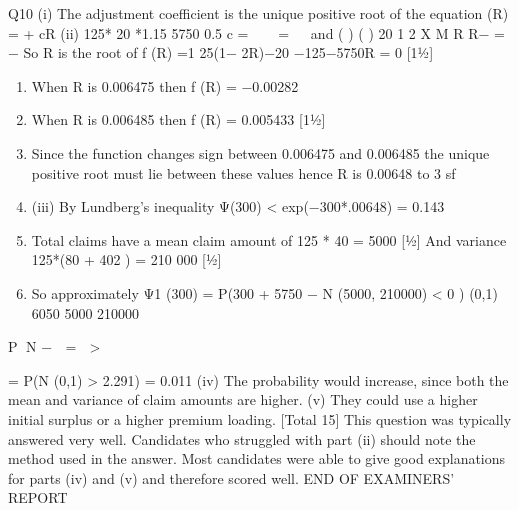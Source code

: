 \documentclass[a4paper,12pt]{article}
\begin{document}

Q10 (i) The adjustment coefficient is the unique positive root of the equation
\lambdaMX (R) = \lambda + cR 
(ii) 125* 20 *1.15 5750
0.5
c =   =
   
and
( ) ( ) 20 1 2 X M R R− = − 
So R is the root of
f (R) =1 25(1− 2R)−20 −125−5750R = 0 [1½]
\begin{enumerate}
\item When R is 0.006475 then f (R) = −0.00282
\item When R is 0.006485 then f (R) = 0.005433 [1½]
\item Since the function changes sign between 0.006475 and 0.006485 the unique
positive root must lie between these values hence R is 0.00648 to 3 sf 
\item (iii) By Lundberg’s inequality Ψ(300) < exp(−300*.00648) = 0.143 
\item Total claims have a mean claim amount of 125 * 40 = 5000 [½]
And variance 125*(80 + 402 ) = 210 000 [½]
\item So approximately
Ψ1 (300) = P(300 + 5750 − N (5000, 210000) < 0 )
(0,1) 6050 5000
210000
\end{enumerate}
P N −  =  > 
 

= P(N (0,1) > 2.291) = 0.011 
(iv) The probability would increase, since both the mean and variance of claim
amounts are higher. 
(v) They could use a higher initial surplus or a higher premium loading. 
[Total 15]
This question was typically answered very well. Candidates who struggled
with part (ii) should note the method used in the answer. Most candidates
were able to give good explanations for parts (iv) and (v) and therefore scored
well.
END OF EXAMINERS’ REPORT
\end{document}
